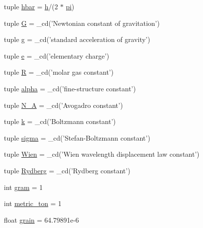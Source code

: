 \begin{DoxyCompactItemize}
\item 
tuple \hyperlink{namespacescipy_1_1constants_1_1constants_aa36d44ec47768083d325c58d761c8169}{hbar} = \hyperlink{namespacescipy_1_1constants_1_1constants_aad83d1b4f2eed9e65764c15b5fd647e7}{h}/(2 $\ast$ \hyperlink{namespacescipy_1_1constants_1_1constants_a0dbffed0c49b0883ca0dba1aca0aca40}{pi})
\item 
tuple \hyperlink{namespacescipy_1_1constants_1_1constants_a41b06e2e1ecf933321d2f9d1d2da9384}{G} = \+\_\+cd('Newtonian constant of gravitation')
\item 
tuple \hyperlink{namespacescipy_1_1constants_1_1constants_a83effeb17733c44ab49399687fb4d21b}{g} = \+\_\+cd('standard acceleration of gravity')
\item 
tuple \hyperlink{namespacescipy_1_1constants_1_1constants_aee16716dbede205b014b27071b7f08ed}{e} = \+\_\+cd('elementary charge')
\item 
tuple \hyperlink{namespacescipy_1_1constants_1_1constants_a14a5a3abbca047b1832769674b0925af}{R} = \+\_\+cd('molar gas constant')
\item 
tuple \hyperlink{namespacescipy_1_1constants_1_1constants_a97e974104a87a2d37ed8d955c2e6afd4}{alpha} = \+\_\+cd('fine-\/structure constant')
\item 
tuple \hyperlink{namespacescipy_1_1constants_1_1constants_a886a45d9f28de163ef0f449720bd0c2d}{N\+\_\+\+A} = \+\_\+cd('Avogadro constant')
\item 
tuple \hyperlink{namespacescipy_1_1constants_1_1constants_a2726af55879d88eb2b803fd423845da5}{k} = \+\_\+cd('Boltzmann constant')
\item 
tuple \hyperlink{namespacescipy_1_1constants_1_1constants_a8da67669a19f297ac21c8c45d05159b0}{sigma} = \+\_\+cd('Stefan-\/Boltzmann constant')
\item 
tuple \hyperlink{namespacescipy_1_1constants_1_1constants_a2d6292a65529f6ea37dd6ea8e1984300}{Wien} = \+\_\+cd('Wien wavelength displacement law constant')
\item 
tuple \hyperlink{namespacescipy_1_1constants_1_1constants_a5bad78cb9c137d905f18295a9942e96f}{Rydberg} = \+\_\+cd('Rydberg constant')
\item 
int \hyperlink{namespacescipy_1_1constants_1_1constants_af4a5b311bb012f3f1d3d37fa13ac3754}{gram} = 1
\item 
int \hyperlink{namespacescipy_1_1constants_1_1constants_a41bbf7ea545a3a7a427fdf75af636ea8}{metric\+\_\+ton} = 1
\item 
float \hyperlink{namespacescipy_1_1constants_1_1constants_addd7f15f05d5a759eb0bd20d7bc96dba}{grain} = 64.\+79891e-\/6

\end{DoxyCompactItemize}
